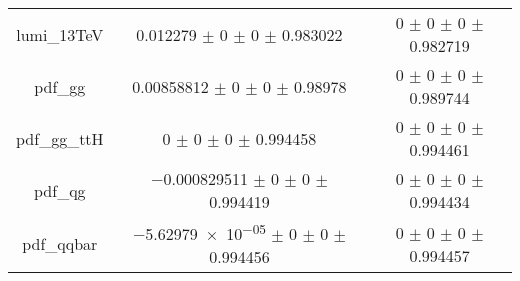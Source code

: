 \begin{table}
\begin{tabular}{ccc}
lumi\_13TeV & \num{0.012279} $\pm$ \num{0} $\pm$ \num{0} $\pm$ \num{0.983022} & \num{0} $\pm$ \num{0} $\pm$ \num{0} $\pm$ \num{0.982719}\\
pdf\_gg & \num{0.00858812} $\pm$ \num{0} $\pm$ \num{0} $\pm$ \num{0.98978} & \num{0} $\pm$ \num{0} $\pm$ \num{0} $\pm$ \num{0.989744}\\
pdf\_gg\_ttH & \num{0} $\pm$ \num{0} $\pm$ \num{0} $\pm$ \num{0.994458} & \num{0} $\pm$ \num{0} $\pm$ \num{0} $\pm$ \num{0.994461}\\
pdf\_qg & \num{-0.000829511} $\pm$ \num{0} $\pm$ \num{0} $\pm$ \num{0.994419} & \num{0} $\pm$ \num{0} $\pm$ \num{0} $\pm$ \num{0.994434}\\
pdf\_qqbar & \num{-5.62979e-05} $\pm$ \num{0} $\pm$ \num{0} $\pm$ \num{0.994456} & \num{0} $\pm$ \num{0} $\pm$ \num{0} $\pm$ \num{0.994457}\\
\bottomrule
\end{tabular}
\end{table}